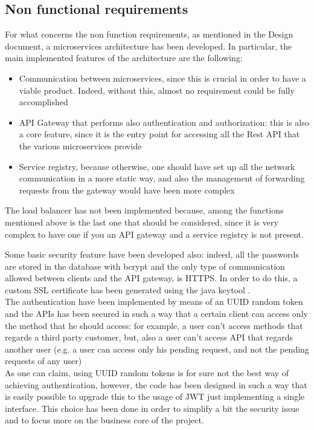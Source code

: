 \subsection{Non functional requirements}
For what concerns the non function requirements, as mentioned in the Design document, a microservices architecture has been developed. 
In particular, the main implemented features of the architecture are the following: 
\begin{itemize}
\item Communication between microservices, since this is crucial in order to have a viable product. Indeed, without this, almost no
requirement could be fully accomplished
\item API Gateway that performs also authentication and authorization: this is also a core feature, since it is the entry point for accessing
all the Rest API that the various microservices provide
\item Service registry, because otherwise, one should have set up all the network communication in a more static way, and also the management
of forwarding requests from the gateway would have been more complex 
\end{itemize}
The load balancer has not been implemented because, among the functions mentioned above is the last one that should be considered, since
it is very complex to have one if you an API gateway and a service registry is not present. \\

\par Some basic security feature have been developed also: indeed, all the passwords are stored in the database with bcrypt and the only type
of communication allowed between clients and the API gateway, is HTTPS. In order to do this, a custom SSL certificate has been
generated using the java keytool \cite{httpstool}.
\\
The authentication have been implemented by means of an UUID random token and the APIs has been secured in such a way that a certain client
can access only the method that he should access: for example, a user can't access methods that regards a third party customer, but, also
a user can't access API that regards another user (e.g. a user can access only his pending request, and not the pending requests of any
user) \\
As one can claim, using UUID random tokens is for sure not the best way of achieving authentication, however, the code has been designed
in such a way that is easily possible to upgrade this to the usage of JWT just implementing a single interface. This choice
has been done in order to simplify a bit the security issue and to focus more on the business core of the project. 

